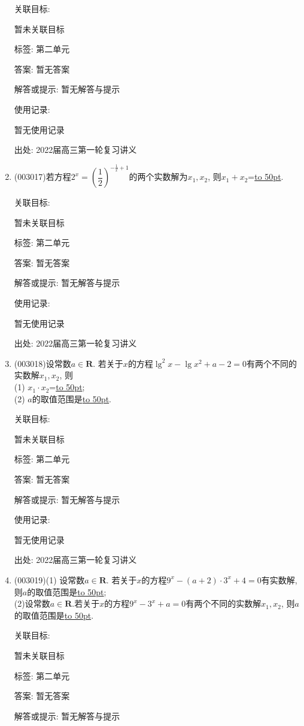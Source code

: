 \documentclass[10pt,a4paper]{article}
\newcommand{\blank}[1]{\underline{\hbox to #1pt{}}}
\begin{document}
\begin{enumerate}[1.]
关联目标:

暂未关联目标



标签: 第二单元

答案: 暂无答案

解答或提示: 暂无解答与提示

使用记录:

暂无使用记录


出处: 2022届高三第一轮复习讲义
\item { (003017)}若方程$2^x=(\dfrac 12)^{-\frac 1x+1}$的两个实数解为$x_1, x_2$, 则$x_1+x_2$=\blank{50}.


关联目标:

暂未关联目标



标签: 第二单元

答案: 暂无答案

解答或提示: 暂无解答与提示

使用记录:

暂无使用记录


出处: 2022届高三第一轮复习讲义
\item { (003018)}设常数$a\in \mathbf{R}$. 若关于$x$的方程$\lg^2x-\lg x^2+a-2=0$有两个不同的实数解$x_1, x_2$, 则\\
(1) $x_1\cdot x_2$=\blank{50};\\
(2) $a$的取值范围是\blank{50}.


关联目标:

暂未关联目标



标签: 第二单元

答案: 暂无答案

解答或提示: 暂无解答与提示

使用记录:

暂无使用记录


出处: 2022届高三第一轮复习讲义
\item { (003019)}(1) 设常数$a\in \mathbf{R}$. 若关于$x$的方程$9^x-(a+2)\cdot 3^x+4=0$有实数解, 则$a$的取值范围是\blank{50};\\
(2)设常数$a\in \mathbf{R}$.若关于$x$的方程$9^x-3^x+a=0$有两个不同的实数解$x_1, x_2$, 则$a$的取值范围是\blank{50}.


关联目标:

暂未关联目标



标签: 第二单元

答案: 暂无答案

解答或提示: 暂无解答与提示


\end{enumerate}
\end{document}

